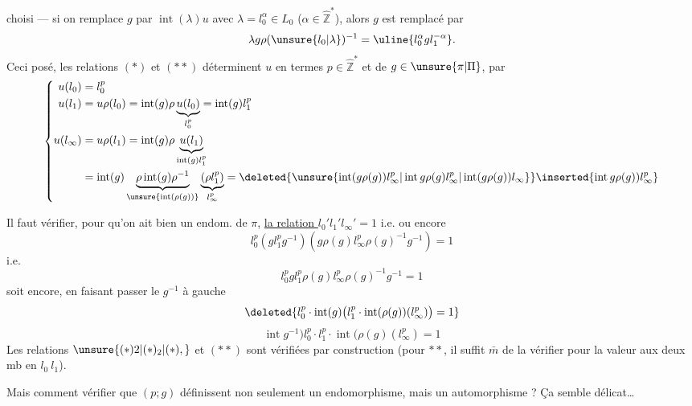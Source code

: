 choisi --- si on  remplace $g$ par $\operatorname{int}(\lambda)u$ avec $\lambda=l_0^\alpha\in L_0$ ($\alpha\in\hat{\mathbb Z}^{*}$), alors $g$ est remplacé par
\[
\lambda g\rho(\unsure{l_0|\lambda})^{-1}=\uline{l_0^\alpha gl_1^{-\alpha}}.
\]
Ceci posé,  les relations $(*)$ et $(**)$ déterminent $u$ en termes $p\in\hat{\mathbb Z}^{*}$ et de $g\in\unsure{\pi|\Pi}$, par
\[
\left\{\begin{aligned}
u(l_0)&=l_0^p\\
u(l_1)&=u\rho(l_0)=\operatorname{int}(g)\rho\underbrace{u(l_0)}_{l_0^p}=\operatorname{int}(g)l_1^p\\
u(l_\infty)&=u\rho(l_1)=\operatorname{int}(g)\rho\underbrace{u(l_1)}_{\operatorname{int}(g)l_1^p}\\
&=\operatorname{int}(g)\underbrace{\rho\operatorname{int}(g)\rho^{-1}}_{\unsure{\operatorname{int}(\rho(g))}}\underbrace{(\rho l_1^p)}_{l_\infty^p}
=\deleted{\unsure{\operatorname{int}(g\rho(g))l_\infty^p|\operatorname{int}g\rho(g)l_\infty^p|\operatorname{int}(g\rho(g))l_\infty}}\inserted{\operatorname{int}g\rho(g))l_\infty^p}
\end{aligned}\right.
\]

Il faut vérifier, pour qu'on ait bien un endom. de $\pi$, \uline{la relation $l_0'l_1'l_\infty'=1$} i.e.
ou encore
\[
l_0^p(gl_1^pg^{-1})(g\rho(g)l_\infty^p\rho(g)^{-1}g^{-1})=1
\]
i.e.
\[
l_0^pgl_1^p\rho(g)l_\infty^p\rho(g)^{-1}g^{-1}=1
\]
soit encore, en faisant passer le $g^{-1}$ à gauche
\[
\deleted{l_0^p\cdot\operatorname{int}(g)\bigl(l_1^p\cdot\operatorname{int}(\rho(g))(l_\infty^p)\bigr)=1}
\]
\[
\operatorname{int}g^{-1})l_0^p\cdot l_1^p\cdot\operatorname{int}(\rho(g)(l_\infty^p)=1
\]
Les relations $\unsure{(*)2|(*)_2|(*),}$ et $(**)$ sont vérifiées par construction (pour $**$, il suffit $\bar m$ de la vérifier pour la valeur aux deux mb en $l_0\ l_1$).

Mais comment vérifier que $(p;g)$ définissent non seulement un endomorphisme, mais un automorphisme ? Ça semble délicat\ldots

